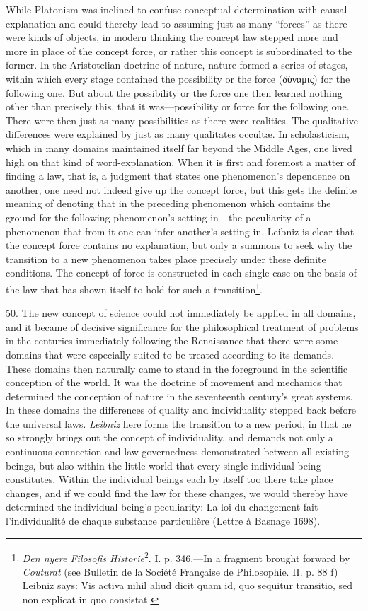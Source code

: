 \documentclass[12pt,a4paper]{book}
\newcommand{\opage}[1]{\marginnote{\footnotesize\textit{[#1]}}}
\begin{document}
While Platonism was inclined to confuse conceptual determination with
causal explanation and could thereby lead to assuming just as many
``forces'' as there were kinds of objects, in modern thinking the concept
law stepped more and more in place of the concept force, or rather this
concept is subordinated to the former. In the Aristotelian doctrine of
nature, nature formed a series of stages, within which every stage
contained the possibility or the force (δύναμις) for the following one. But
about the possibility or the force one then learned nothing other than
precisely this, that it was---possibility or force for the following one.
There were then just as many possibilities as there were realities. The
qualitative differences were explained by just as many qualitates occultæ.
In scholasticism, which in many domains maintained itself far beyond the
Middle Ages, one lived high on that kind of word-explanation. When it is
first and foremost a matter of finding a law, that is, a judgment that
states one phenomenon's dependence on another, one need not indeed give up
the concept force, but this gets the definite \opage{132}meaning of denoting that in
the preceding phenomenon which contains the ground for the following
phenomenon's setting-in---the peculiarity of a phenomenon that from it one
can infer another's setting-in. Leibniz is clear that the concept force
contains no explanation, but only a summons to seek why the transition to a
new phenomenon takes place precisely under these definite conditions. The
concept of force is constructed in each single case on the basis of the law
that has shown itself to hold for such a transition\footnote{\emph{Den
nyere Filosofis Historie}\textsuperscript{2}. I. p. 346.---In a fragment
brought forward by \emph{Couturat} (see Bulletin de la Société Française de
Philosophie. II. p. 88 f) Leibniz says: Vis activa nihil aliud dicit quam
id, quo sequitur transitio, sed non explicat in quo consistat.}.

50. The new concept of science could not immediately be applied in all
domains, and it became of decisive significance for the philosophical
treatment of problems in the centuries immediately following the
Renaissance that there were some domains that were especially suited to be
treated according to its demands. These domains then naturally came to
stand in the foreground in the scientific conception of the world. It was
the doctrine of movement and mechanics that determined the conception of
nature in the seventeenth century's great systems. In these domains the
differences of quality and individuality stepped back before the universal
laws. \emph{Leibniz} here forms the transition to a new period, in that he
so strongly brings out the concept of individuality, and demands not only a
continuous connection and law-governedness demonstrated between all
existing beings, but also within the little world that every single
individual being constitutes. Within the individual beings each by itself
too there take place changes, and if we could find the law for these
changes, we would thereby have determined the individual being's
peculiarity: La loi du changement fait l'individualité de chaque substance
particulière (Lettre à Basnage 1698).
\end{document}
